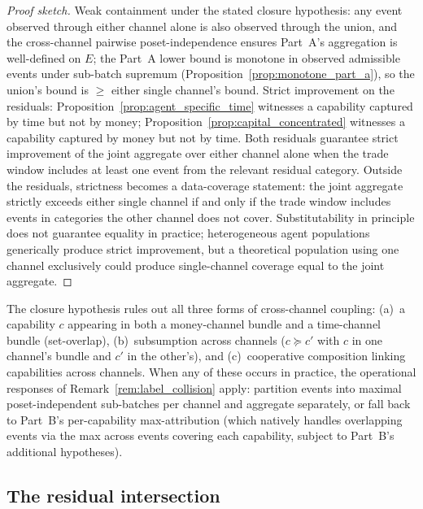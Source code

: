 \begin{proof}[Proof sketch]
Weak containment under the stated closure hypothesis: any event
observed through either channel alone is also observed through
the union, and the cross-channel pairwise poset-independence
ensures Part~A's aggregation is well-defined on $E$; the Part~A
lower bound is monotone in observed admissible events under
sub-batch supremum
(Proposition~\ref{prop:monotone_part_a}), so the union's bound
is $\geq$ either single channel's bound.  Strict improvement on the
residuals: Proposition~\ref{prop:agent_specific_time} witnesses
a capability captured by time but not by money;
Proposition~\ref{prop:capital_concentrated} witnesses a
capability captured by money but not by time.  Both residuals
guarantee strict improvement of the joint aggregate over either
channel alone when the trade window includes at least one event
from the relevant residual category.  Outside the residuals,
strictness becomes a data-coverage statement: the joint
aggregate strictly exceeds either single channel if and only if
the trade window includes events in categories the other
channel does not cover.  Substitutability in principle does not
guarantee equality in practice; heterogeneous agent populations
generically produce strict improvement, but a theoretical
population using one channel exclusively could produce
single-channel coverage equal to the joint aggregate.
\end{proof}

\begin{remark}
\label{rem:cross_channel_overlap}
The closure hypothesis rules out all three forms of
cross-channel coupling: (a)~a capability $c$ appearing in both
a money-channel bundle and a time-channel bundle (set-overlap),
(b)~subsumption across channels ($c \succeq c'$ with $c$ in one
channel's bundle and $c'$ in the other's), and (c)~cooperative
composition linking capabilities across channels.  When any of
these occurs in practice, the operational responses of
Remark~\ref{rem:label_collision} apply: partition events into
maximal poset-independent sub-batches per channel and aggregate
separately, or fall back to Part~B's per-capability
max-attribution (which natively handles overlapping events via
the max across events covering each capability, subject to
Part~B's additional hypotheses).
\end{remark}

\subsection{The residual intersection}

